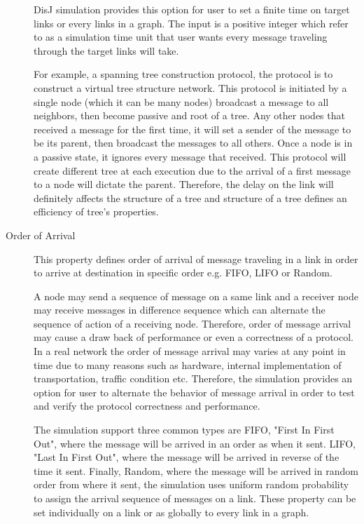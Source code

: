 \begin{description}
DisJ simulation provides this option for user to set a finite time on target links or every links in a graph. The input is a positive integer which refer to as a simulation time unit that user wants every message traveling through the target links will take.

For example, a spanning tree construction protocol, the protocol is to construct a virtual tree structure network. This protocol is initiated by a single node (which it can be many nodes) broadcast a message to all neighbors, then become passive and root of a tree. Any other nodes that received a message for the first time, it will set a sender of the message to be its parent, then broadcast the messages to all others. Once a node is in a passive state, it ignores every message that received. This protocol will create different tree at each execution due to the arrival of a first message to a node will dictate the parent. Therefore, the delay on the link will definitely affects the structure of a tree and structure of a tree defines an efficiency of tree's properties.


\item[Order of Arrival]
This property defines order of arrival of message traveling in a link in order to arrive at destination in specific order e.g. FIFO, LIFO or Random.

A node may send a sequence of message on a same link and a receiver node may receive messages in difference sequence which can alternate the sequence of action of a receiving node. Therefore, order of message arrival may cause a draw back of performance or even a correctness of a protocol. In a real network the order of message arrival may varies at any point in time due to many reasons such as hardware, internal implementation of transportation, traffic condition etc. Therefore, the simulation provides an option for user to alternate the behavior of message arrival in order to test and verify the protocol correctness and performance.

The simulation support three common types are FIFO, "First In First Out", where the message will be arrived in an order as when it sent. LIFO, "Last In First Out", where the message will be arrived in reverse of the time it sent. Finally, Random, where the message will be arrived in random order from where it sent, the simulation uses uniform random probability to assign the arrival sequence of messages on a link. These property can be set individually on a link or as globally to every link in a graph.


\end{description}
